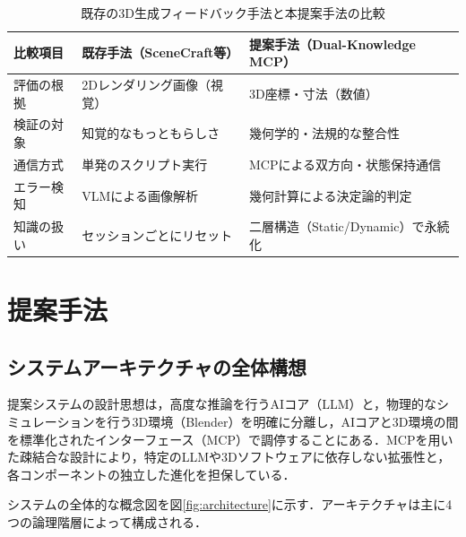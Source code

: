 \documentclass[dvipdfmx, a4paper, 9pt]{deimj}
\begin{document}
\begin{table}[ht]
  \caption{既存の3D生成フィードバック手法と本提案手法の比較}
  \label{tab:comparison}
  \centering
  \small
  \begin{tabularx}{\columnwidth}{lXX}
    \toprule
    比較項目 & 既存手法（SceneCraft等） & 提案手法（Dual-Knowledge MCP）\\
    \midrule
    評価の根拠 & 2Dレンダリング画像（視覚） & 3D座標・寸法（数値）\\
    検証の対象 & 知覚的なもっともらしさ & 幾何学的・法規的な整合性\\
    通信方式 & 単発のスクリプト実行 & MCPによる双方向・状態保持通信\\
    エラー検知 & VLMによる画像解析 & 幾何計算による決定論的判定\\
    知識の扱い & セッションごとにリセット & 二層構造（Static/Dynamic）で永続化\\
    \bottomrule
  \end{tabularx}
\end{table}

\section{提案手法}

\subsection{システムアーキテクチャの全体構想}

提案システムの設計思想は，高度な推論を行うAIコア（LLM）と，物理的なシミュレーションを行う3D環境（Blender\cite{community2018blender}）を明確に分離し，AIコアと3D環境の間を標準化されたインターフェース（MCP）で調停することにある．MCPを用いた疎結合な設計により，特定のLLMや3Dソフトウェアに依存しない拡張性と，各コンポーネントの独立した進化を担保している．

システムの全体的な概念図を図\ref{fig:architecture}に示す．アーキテクチャは主に4つの論理階層によって構成される．
\end{document}

